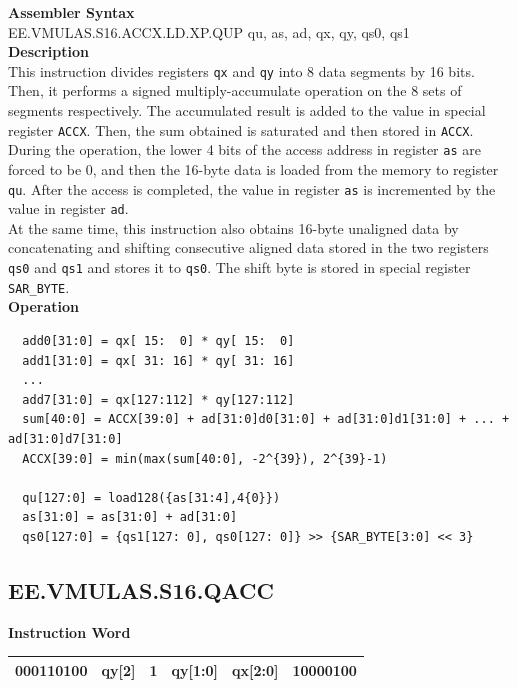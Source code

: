 \textbf{Assembler Syntax} \\
EE.VMULAS.S16.ACCX.LD.XP.QUP qu, as, ad, qx, qy, qs0, qs1 \\
\textbf{Description} \\
This instruction divides registers \lstinline{qx} and \lstinline{qy} into 8 data segments by 16 bits. Then, it performs a signed multiply-accumulate operation on the 8 sets of segments respectively. The accumulated result is added to the value in special register \lstinline{ACCX}. Then, the sum obtained is saturated and then stored in \lstinline{ACCX}.\\
During the operation, the lower 4 bits of the access address in register \lstinline{as} are forced to be 0, and then the 16-byte data is loaded from the memory to register \lstinline{qu}. After the access is completed, the value in register \lstinline{as} is incremented by the value in register \lstinline{ad}.\\
At the same time, this instruction also obtains 16-byte unaligned data by concatenating and shifting consecutive aligned data stored in the two registers \lstinline{qs0} and \lstinline{qs1} and stores it to \lstinline{qs0}. The shift byte is stored in special register \lstinline{SAR_BYTE}.\\
\textbf{Operation}
\begin{lstlisting}
  add0[31:0] = qx[ 15:  0] * qy[ 15:  0]
  add1[31:0] = qx[ 31: 16] * qy[ 31: 16]
  ...
  add7[31:0] = qx[127:112] * qy[127:112]
  sum[40:0] = ACCX[39:0] + ad[31:0]d0[31:0] + ad[31:0]d1[31:0] + ... + ad[31:0]d7[31:0]
  ACCX[39:0] = min(max(sum[40:0], -2^{39}), 2^{39}-1)

  qu[127:0] = load128({as[31:4],4{0}})
  as[31:0] = as[31:0] + ad[31:0]
  qs0[127:0] = {qs1[127: 0], qs0[127: 0]} >> {SAR_BYTE[3:0] << 3}
\end{lstlisting}

\clearpage
\subsection{EE.VMULAS.S16.QACC}\label{instruction:EEVMULASS16QACC}
\setlength\tabcolsep{6pt}
\textbf{Instruction Word} \\
\begin{tabular}{|c|c|c|c|c|c|}
	\hline
	000110100 & qy[2] & 1 & qy[1:0] & qx[2:0] & 10000100 \\
	\hline
\end{tabular}


